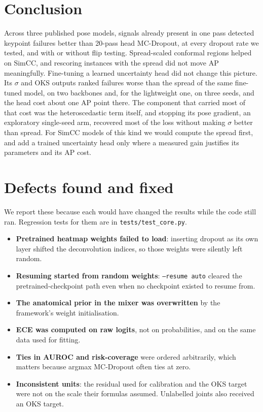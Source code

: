 \documentclass[preprint,11pt]{elsarticle}
\begin{document}
\section{Conclusion}

Across three published pose models, signals already present in one pass detected keypoint failures
better than 20-pass head MC-Dropout, at every dropout rate we tested, and with or without flip
testing. Spread-scaled conformal regions helped on SimCC, and rescoring instances with the spread did
not move AP meaningfully.
Fine-tuning a learned uncertainty head did not change this picture. Its $\sigma$ and OKS outputs ranked
failures worse than the spread of the same fine-tuned model, on two backbones and, for the lightweight
one, on three seeds, and the head cost about one AP point there. The component that carried most of that
cost was the heteroscedastic term itself, and stopping its pose gradient, an exploratory single-seed arm,
recovered most of the loss without making $\sigma$ better than spread. For SimCC models of this kind we
would compute the spread first, and add a trained uncertainty head only where a measured gain justifies
its parameters and its AP cost.

\appendix
\section{Defects found and fixed}\label{app:defects}

We report these because each would have changed the results while the code still ran. Regression
tests for them are in \texttt{tests/test\_core.py}.
\begin{itemize}
\item \textbf{Pretrained heatmap weights failed to load}: inserting dropout as its own layer shifted
the deconvolution indices, so those weights were silently left random.
\item \textbf{Resuming started from random weights}: \texttt{--resume auto} cleared the
pretrained-checkpoint path even when no checkpoint existed to resume from.
\item \textbf{The anatomical prior in the mixer was overwritten} by the framework's weight
initialisation.
\item \textbf{ECE was computed on raw logits}, not on probabilities, and on the same data used for
fitting.
\item \textbf{Ties in AUROC and risk-coverage} were ordered arbitrarily, which matters because argmax
MC-Dropout often ties at zero.
\item \textbf{Inconsistent units}: the residual used for calibration and the OKS target were not on
the scale their formulas assumed. Unlabelled joints also received an OKS target.
\end{itemize}
\end{document}

